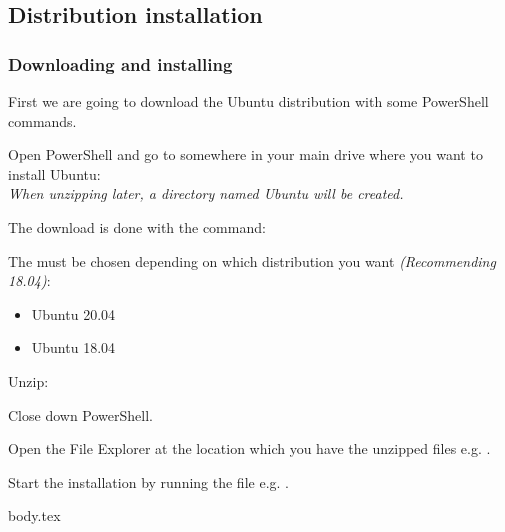 \subsection{Distribution installation}

\subsubsection{Downloading and installing}
First we are going to download the Ubuntu distribution with some PowerShell commands.

Open PowerShell and go to somewhere in your main drive where you want to install Ubuntu:\\
\textit{When unzipping later, a directory named Ubuntu will be created.}\\

The download is done with the command:\\

The  must be chosen depending on which distribution you want \textit{(Recommending 18.04)}:
\begin{itemize}
    \item Ubuntu 20.04 
    \item Ubuntu 18.04 
\end{itemize}

Unzip:\\

Close down PowerShell.

Open the File Explorer at the location which you have the unzipped files e.g. .

Start the installation by running the  file e.g. .

{body.tex}